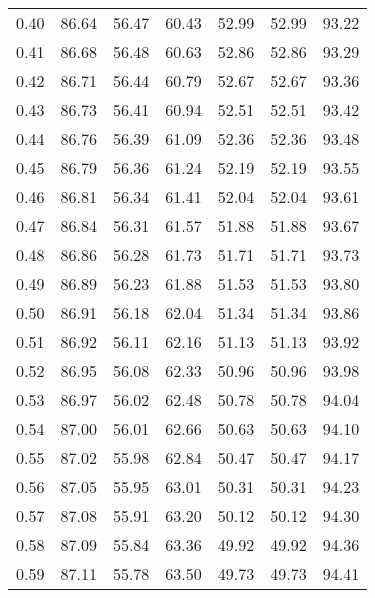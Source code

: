 \begin{tabular}{|c|c|c|c|c|c|c|}
      0.40 &     86.64 &     56.47 &      60.43 &   52.99 &      52.99 &         93.22 \\
      0.41 &     86.68 &     56.48 &      60.63 &   52.86 &      52.86 &         93.29 \\
      0.42 &     86.71 &     56.44 &      60.79 &   52.67 &      52.67 &         93.36 \\
      0.43 &     86.73 &     56.41 &      60.94 &   52.51 &      52.51 &         93.42 \\
      0.44 &     86.76 &     56.39 &      61.09 &   52.36 &      52.36 &         93.48 \\
      0.45 &     86.79 &     56.36 &      61.24 &   52.19 &      52.19 &         93.55 \\
      0.46 &     86.81 &     56.34 &      61.41 &   52.04 &      52.04 &         93.61 \\
      0.47 &     86.84 &     56.31 &      61.57 &   51.88 &      51.88 &         93.67 \\
      0.48 &     86.86 &     56.28 &      61.73 &   51.71 &      51.71 &         93.73 \\
      0.49 &     86.89 &     56.23 &      61.88 &   51.53 &      51.53 &         93.80 \\
      0.50 &     86.91 &     56.18 &      62.04 &   51.34 &      51.34 &         93.86 \\
      0.51 &     86.92 &     56.11 &      62.16 &   51.13 &      51.13 &         93.92 \\
      0.52 &     86.95 &     56.08 &      62.33 &   50.96 &      50.96 &         93.98 \\
      0.53 &     86.97 &     56.02 &      62.48 &   50.78 &      50.78 &         94.04 \\
      0.54 &     87.00 &     56.01 &      62.66 &   50.63 &      50.63 &         94.10 \\
      0.55 &     87.02 &     55.98 &      62.84 &   50.47 &      50.47 &         94.17 \\
      0.56 &     87.05 &     55.95 &      63.01 &   50.31 &      50.31 &         94.23 \\
      0.57 &     87.08 &     55.91 &      63.20 &   50.12 &      50.12 &         94.30 \\
      0.58 &     87.09 &     55.84 &      63.36 &   49.92 &      49.92 &         94.36 \\
      0.59 &     87.11 &     55.78 &      63.50 &   49.73 &      49.73 &         94.41 \\

\end{tabular}

